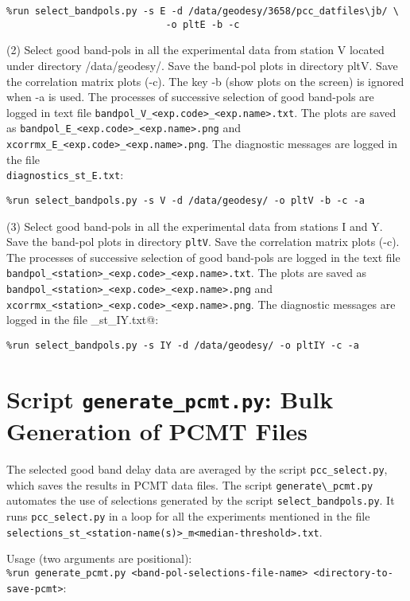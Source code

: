 \documentclass[preprint]{aastex}
\begin{document}
\verb$%run select_bandpols.py -s E -d /data/geodesy/3658/pcc_datfiles\jb/ \$ \\
\verb$                            -o pltE -b -c$

(2) Select good band-pols in all the experimental data from station V
located under directory /data/geodesy/. 
Save the band-pol plots in directory pltV. Save the correlation matrix plots
(-c). The key -b (show plots on the screen) is ignored when -a is used.  
The processes of successive selection of good band-pols are
logged in text file \verb$bandpol_V_<exp.code>_<exp.name>.txt$. 
The plots are saved as \verb$bandpol_E_<exp.code>_<exp.name>.png$ and \\
\verb$xcorrmx_E_<exp.code>_<exp.name>.png$.
The diagnostic messages are logged in the file\\
\verb$diagnostics_st_E.txt$:

\verb$%run select_bandpols.py -s V -d /data/geodesy/ -o pltV -b -c -a$

(3) Select good band-pols in all the experimental data from stations
I and Y. Save the band-pol plots in directory \verb$pltV$. Save the correlation matrix
plots (-c).  
The processes of successive selection of good band-pols are logged in the text file \verb$bandpol_<station>_<exp.code>_<exp.name>.txt$. The plots are saved as \verb$bandpol_<station>_<exp.code>_<exp.name>.png$ and \\
\verb$xcorrmx_<station>_<exp.code>_<exp.name>.png$.
The diagnostic messages are logged in the file \verb@diagnostics_st_IY.txt@:

\verb$%run select_bandpols.py -s IY -d /data/geodesy/ -o pltIY -c -a$



\section{Script \texttt{generate\_pcmt.py}: Bulk Generation of PCMT Files}

The selected good band delay data are averaged by the script \verb$pcc_select.py$, which saves the results in PCMT data files. The script \verb$generate\_pcmt.py$ automates the use of selections generated by the script \verb$select_bandpols.py$. It runs \verb$pcc_select.py$ in a loop for all the experiments mentioned in the file \verb$selections_st_<station-name(s)>_m<median-threshold>.txt$.

Usage (two arguments are positional): \\
\texttt{\%run generate\_pcmt.py   <band-pol-selections-file-name>  <directory-to-save-pcmt>}:
\end{document}
